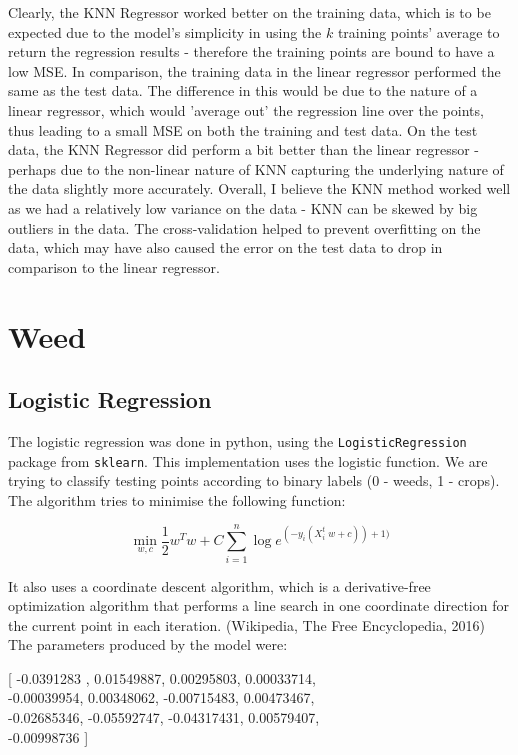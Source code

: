 \documentclass{scrartcl}
\begin{document}
Clearly, the KNN Regressor worked better on the training data, which is to be expected due to the model's simplicity in using the $k$ training points' average to return the regression results - therefore the training points are bound to have a low MSE. In comparison, the training data in the linear regressor performed the same as the test data. The difference in this would be due to the nature of a linear regressor, which would 'average out' the regression line over the points, thus leading to a small MSE on both the training and test data. On the test data, the KNN Regressor did perform a bit better than the linear regressor - perhaps due to the non-linear nature of KNN capturing the underlying nature of the data slightly more accurately. Overall, I believe the KNN method worked well as we had a relatively low variance on the data - KNN can be skewed by big outliers in the data. The cross-validation helped to prevent overfitting on the data, which may have also caused the error on the test data to drop in comparison to the linear regressor.

\newpage
\section{Weed}

\subsection{Logistic Regression}
The logistic regression was done in python, using the \texttt{LogisticRegression} package from \texttt{sklearn}. This implementation uses the logistic function. We are trying to classify testing points according to binary labels (0 - weeds, 1 - crops). The algorithm tries to minimise the following function:

\[ \min_{w, c} \frac{1} {2} w^T w + C \sum^n_{i=1} \log e ^{(-y_i(X^t_i \; w + c)) +1)} \]

It also uses a coordinate descent algorithm, which is a derivative-free optimization algorithm that performs a line search in one coordinate direction for the current point in each iteration. (Wikipedia, The Free Encyclopedia, 2016)\\

The parameters produced by the model were:

\begin{center}
[  -0.0391283 ,  0.01549887,  0.00295803,  0.00033714, \\
   -0.00039954,  0.00348062, -0.00715483,  0.00473467, \\
   -0.02685346, -0.05592747, -0.04317431,  0.00579407, \\
  -0.00998736
]
\end{center}
\end{document}
